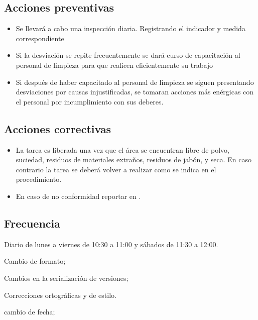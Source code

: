 \subsection{Acciones preventivas}

\begin{itemize}
	\item Se llevará a cabo una inspección diaria. Registrando el indicador y medida correspondiente
	\item Si la desviación se repite frecuentemente se dará curso de capacitación al personal de limpieza para que realicen eficientemente su trabajo
	\item Si después de haber capacitado al personal de limpieza se siguen presentando desviaciones por causas injustificadas, se tomaran acciones más enérgicas con el personal por incumplimiento con sus deberes.
\end{itemize}

\subsection{Acciones correctivas}

\begin{itemize}
	\item La tarea es liberada una vez que el área se encuentran libre de polvo, suciedad, residuos de materiales extraños, residuos de jabón, y seca. En caso contrario la tarea se deberá volver a realizar como se indica en el procedimiento.
	\item En caso de no conformidad reportar en \RAC.
\end{itemize}

\subsection{Frecuencia}

Diario de lunes a viernes de 10:30 a 11:00 y sábados de 11:30 a 12:00.

\begin{changelog}[simple, sectioncmd=\subsection*,label=changelog-\thesection-\MayorVer.\MenorVer6]
	\begin{version}[v=\MayorVer.\MenorVer, date=2023--01, author=Pablo E. Alanis]
		\item Cambio de formato;
		\item Cambios en la serialización de versiones;
		\item Correcciones ortográficas y de estilo.
	\end{version}

	\begin{version}[v=1.7, date=2022--05, author=Alonso M.]
		\item cambio de fecha;
	\end{version}	

\end{changelog}